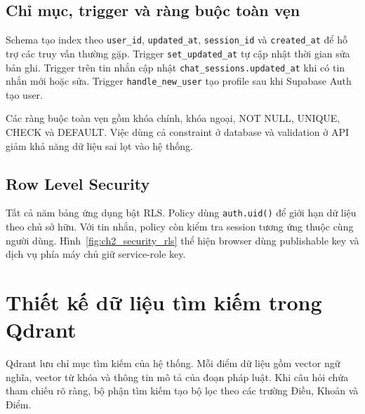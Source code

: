 \documentclass[12pt,a4paper,oneside]{report}
\begin{document}
\subsection{Chỉ mục, trigger và ràng buộc toàn vẹn}
Schema tạo index theo \texttt{user\_id}, \texttt{updated\_at}, \texttt{session\_id} và \texttt{created\_at} để hỗ trợ các truy vấn thường gặp. Trigger \texttt{set\_updated\_at} tự cập nhật thời gian sửa bản ghi. Trigger trên tin nhắn cập nhật \texttt{chat\_sessions.updated\_at} khi có tin nhắn mới hoặc sửa. Trigger \texttt{handle\_new\_user} tạo profile sau khi Supabase Auth tạo user.

Các ràng buộc toàn vẹn gồm khóa chính, khóa ngoại, NOT NULL, UNIQUE, CHECK và DEFAULT. Việc dùng cả constraint ở database và validation ở API giảm khả năng dữ liệu sai lọt vào hệ thống.

\subsection{Row Level Security}
Tất cả năm bảng ứng dụng bật RLS. Policy dùng \texttt{auth.uid()} để giới hạn dữ liệu theo chủ sở hữu. Với tin nhắn, policy còn kiểm tra session tương ứng thuộc cùng người dùng. Hình~\ref{fig:ch2_security_rls} thể hiện browser dùng publishable key và dịch vụ phía máy chủ giữ service-role key.

\section{Thiết kế dữ liệu tìm kiếm trong Qdrant}
Qdrant lưu chỉ mục tìm kiếm của hệ thống. Mỗi điểm dữ liệu gồm vector ngữ nghĩa, vector từ khóa và thông tin mô tả của đoạn pháp luật. Khi câu hỏi chứa tham chiếu rõ ràng, bộ phận tìm kiếm tạo bộ lọc theo các trường Điều, Khoản và Điểm.
\end{document}

